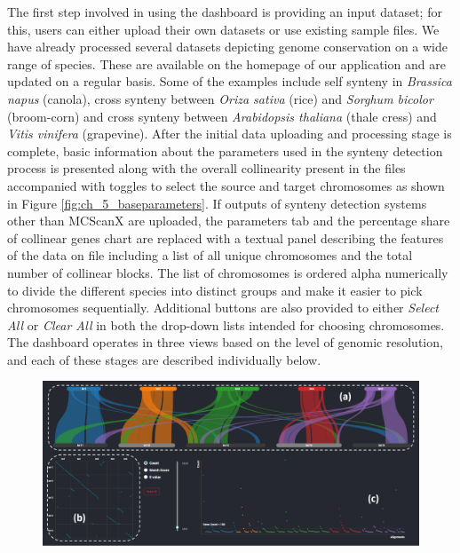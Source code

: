 The first step involved in using the dashboard is providing an input dataset; for this, users can either upload their own datasets or use existing sample files. We have already processed several datasets depicting genome conservation on a wide range of species. These are available on the homepage of our application and are updated on a regular basis. Some of the examples include self synteny in \textit{Brassica napus} (canola), cross synteny between \textit{Oriza sativa} (rice) and \textit{Sorghum bicolor} (broom-corn) and cross synteny between \textit{Arabidopsis thaliana} (thale cress) and \textit{Vitis vinifera} (grapevine). After the initial data uploading and processing stage is complete, basic information about the parameters used in the synteny detection process is presented along with the overall collinearity present in the files accompanied with toggles to select the source and target chromosomes as shown in Figure \ref{fig:ch_5_baseparameters}. If outputs of synteny detection systems other than MCScanX are uploaded, the parameters tab and the percentage share of collinear genes chart are replaced with a textual panel describing the features of the data on file including a list of all unique chromosomes and the total number of collinear blocks. The list of chromosomes is ordered alpha numerically to divide the different species into distinct groups and make it easier to pick chromosomes sequentially. Additional buttons are also provided to either \textit{Select All} or \textit{Clear All} in both the drop-down lists intended for choosing chromosomes. The dashboard operates in three views based on the level of genomic resolution, and each of these stages are described individually below.

\begin{figure}
  \centering
  \includegraphics[width=1\linewidth]{images/ch_1_dashboard.PNG}
  \label{fig:ch_4_dashboard}
\end{figure} 

